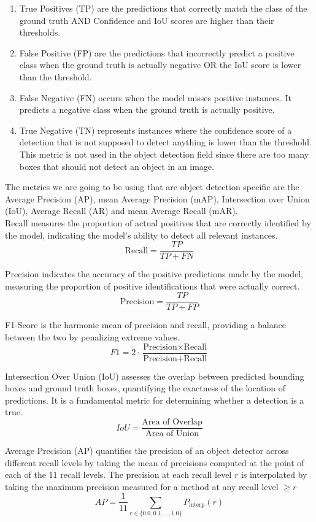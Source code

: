 \begin{enumerate}
    \item True Positives (TP) are the predictions that correctly match the class of the ground truth AND Confidence and IoU scores are 
    higher than their thresholds.
    \item False Positive (FP) are the predictions that incorrectly predict a positive class when the ground truth is actually negative 
    OR the IoU score is lower than the threshold.
    \item False Negative (FN) occurs when the model misses positive instances. It predicts a negative class when the ground truth is actually positive.
    \item True Negative (TN) represents instances where the confidence score of a detection that is not supposed to detect anything is lower than 
    the threshold. This metric is not used in the object detection field since there are too many boxes that should not detect an object in an image.
\end{enumerate}


The metrics we are going to be using that are object detection specific are the Average Precision (AP), mean Average Precision (mAP), Intersection over 
Union (IoU), Average Recall (AR) and mean Average Recall (mAR). \\


Recall measures the proportion of actual positives that are correctly identified by the model, indicating the model’s ability to detect all relevant instances.
\[\text{Recall} = \frac{TP}{TP + FN}\]


Precision indicates the accuracy of the positive predictions made by the model, measuring the proportion of positive identifications that were actually correct.
\[\text{Precision} = \frac{TP}{TP + FP}\]


F1-Score is the harmonic mean of precision and recall, providing a balance between the two by penalizing extreme values.
\[F1 = 2 \cdot \frac{\text{Precision} \times \text{Recall}}{\text{Precision} + \text{Recall}}\]

Intersection Over Union (IoU) assesses the overlap between predicted bounding boxes and ground truth boxes, quantifying the exactness of the location 
of predictions. It is a fundamental metric for determining whether a detection is a true.
\[IoU = \frac{\text{Area of Overlap}}{\text{Area of Union}}\]


Average Precision (AP) quantifies the precision of an object detector across different recall levels by taking the mean of precisions computed 
at the point of each of the 11 recall levels. The precision at each recall level $r$ is interpolated by taking the maximum precision measured 
for a method at any recall level $\geqslant r$
\[AP = \frac{1}{11} \sum_{r \in \{0.0, 0.1, \ldots, 1.0\}} P_{\text{interp}}(r)\]


